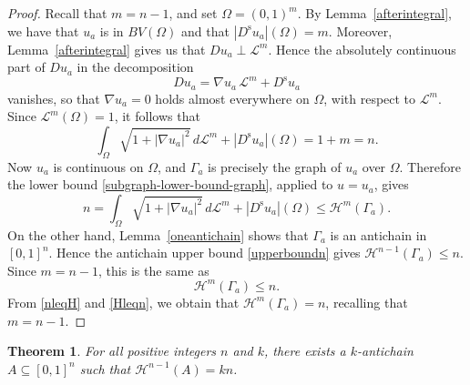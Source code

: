 \documentclass[10pt,a4paper]{amsart}
\newtheorem{theorem}{Theorem}
\begin{document}
\begin{proof}
 Recall that $m=n-1$, and set $ \Omega=(0,1)^m$. By Lemma~\ref{afterintegral}, we have that $u_a$ is in $ BV(\Omega)$ and that $ |D^{\operatorname{s}}u_a|(\Omega) = m$. 
 Moreover, Lemma~\ref{afterintegral} gives us that $Du_a \perp \mathcal{L}^m$. Hence the absolutely continuous part of \(Du_a\) in the decomposition $$ Du_a = \nabla u_a \, 
 \mathcal{L}^m+D^{\operatorname{s}}u_a $$ vanishes, so that $ \nabla u_a=0$ holds almost everywhere on $\Omega$, with respect to $\mathcal{L}^{m}$. 
 Since $\mathcal{L}^m(\Omega)=1$, it follows that $$ \int_{\Omega}\sqrt{1+|\nabla u_a|^2}\,d\mathcal L^m + |D^{\operatorname{s}}u_a|(\Omega) = 1+m = n. $$ 
 Now $u_a$ is continuous on $\Omega$, and $\Gamma_a$ is precisely the graph of \(u_a\) over \(\Omega\). Therefore the lower bound \eqref{subgraph-lower-bound-graph}, applied 
 to $u = u_a$, gives 
\begin{equation}\label{nleqH} 
 n = \int_{\Omega}\sqrt{1+|\nabla u_a|^2}\,d\mathcal L^m + |D^{\operatorname{s}}u_a|(\Omega) \leq \mathcal H^m(\Gamma_a).
\end{equation}
 On the other hand, Lemma~\ref{oneantichain} shows that $\Gamma_a$ is an antichain in $[0,1]^n$. Hence the antichain upper bound \eqref{upperboundn} gives 
 $ \mathcal H^{n-1}(\Gamma_a)\leq n$. Since \(m=n-1\), this is the same as 
\begin{equation}\label{Hleqn} 
 \mathcal H^m(\Gamma_a)\leq n.
\end{equation}
 From \eqref{nleqH} and \eqref{Hleqn}, we obtain that $ \mathcal{H}^m(\Gamma_a)=n$, recalling that $m=n-1$. 
\end{proof}


\begin{theorem}
 For all positive integers $n$ and $k$, there exists a $k$-antichain \(A\subseteq[0,1]^n\) such that $ \mathcal H^{n-1}(A)=kn$.
\end{theorem}
\end{document}
